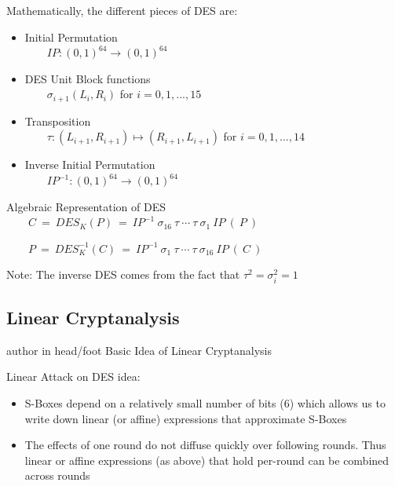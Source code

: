 \documentclass[9pt]{beamer}
\begin{document}
\begin{frame}
Mathematically, the different pieces of DES are:

\begin{itemize}
\item{Initial Permutation \\ $\qquad IP : (0,1)^{64} \rightarrow (0,1)^{64}$}
\item{DES Unit Block functions \\ $\qquad \sigma_{i+1} (L_i,R_i)$ for $i = 0,1,...,15$}
\item{Transposition \\ $\qquad \tau : (L_{i+1},R_{i+1}) \mapsto (R_{i+1},L_{i+1})$ for $i = 0,1,...,14$}
\item{Inverse Initial Permutation \\ $\qquad IP^{-1} : (0,1)^{64} \rightarrow (0,1)^{64}$}
\end{itemize}

\pause
\begin{block}{Algebraic Representation of DES}
$\qquad C \:  = \:  DES_K (P) \: = \: IP^{-1} \: \sigma_{16} \:  \tau \: \cdots \:  \tau \:  \sigma_1 \: IP \: (\: P \: )$

$\qquad P \: = \: DES^{-1}_K (C) \: = \: IP^{-1} \: \sigma_{1} \: \tau \: \cdots \: \tau \: \sigma_{16} \: IP \: (\: C\: )$
\end{block}

\pause
\vspace{0.2in}
{\small Note: The inverse DES comes from the fact that $\tau^2 = \sigma_i^2 = 1$}
\end{frame}

\subsection{Linear Cryptanalysis}
\begin{frame}
\begin{beamercolorbox}[ht=2.5ex,dp=1.125ex,center,rounded=true,shadow=true]{author in head/foot}
Basic Idea of Linear Cryptanalysis
\end{beamercolorbox}
\end{frame}

\begin{frame}
Linear Attack on DES idea:

\begin{itemize}[<+->]
\item S-Boxes depend on a relatively small number of bits (6) which allows us to write down linear (or affine) expressions that approximate S-Boxes
\item The effects of one round do not diffuse quickly over following rounds. Thus linear or affine expressions (as above) that hold per-round can be combined across rounds
\end{itemize}
\end{frame}
\end{document}
